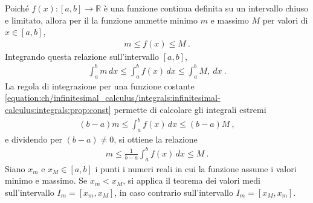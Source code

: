 \documentclass[letterpaper,10pt,italian]{jupyterBook}
\begin{document}
\sphinxAtStartPar
Poiché \(f(x): [a,b] \rightarrow \mathbb{R}\) è una funzione continua definita su un intervallo chiuso e limitato, allora per il {\hyperref[\detokenize{ch/infinitesimal_calculus/analysis:infinitesimal-calculus-continuous-fun-thms-weierstrass}]{}} la funzione ammette minimo \(m\) e massimo \(M\) per valori di \(x \in [a,b]\),
\begin{equation*}
\begin{split}m \le f(x) \le M \ .\end{split}
\end{equation*}
\sphinxAtStartPar
Integrando questa relazione sull’intervallo \([a,b]\),
\begin{equation*}
\begin{split}\int_{a}^{b} m \, dx \le \int_{a}^{b} f(x) \, dx \le \int_{a}^{b} M ,\ dx \ .\end{split}
\end{equation*}
\sphinxAtStartPar
La regola di integrazione per una funzione costante \eqref{equation:ch/infinitesimal_calculus/integrals:infinitesimal-calculus:integrals:prop:const} permette di calcolare gli integrali estremi
\begin{equation*}
\begin{split}(b-a) m \le \int_{a}^{b} f(x) \, dx \le (b-a) M \ ,\end{split}
\end{equation*}
\sphinxAtStartPar
e dividendo per \((b-a) \ne 0\), si ottiene la relazione
\begin{equation*}
\begin{split}m \le \frac{1}{b-a} \int_{a}^{b} f(x) \, dx \le M \ .\end{split}
\end{equation*}
\sphinxAtStartPar
Siano \(x_m\) e \(x_M \in [a,b]\) i punti \sphinxhyphen{} i numeri reali \sphinxhyphen{} in cui la funzione assume i valori minimo e massimo. Se \(x_m < x_M\), si applica il teorema dei valori medi sull’intervallo \(I_m = [x_m, x_M]\), in caso contrario sull’intervallo \(I_m = [x_M, x_m]\).
\end{document}

